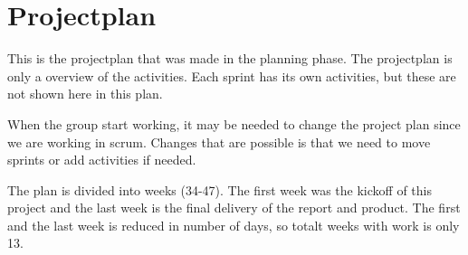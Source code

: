 \section{Projectplan}

	This is the projectplan that was made in the planning phase. The projectplan
	is only a overview of the activities. Each sprint has its own activities, but
	these are not shown here in this plan. 

	When the group start working, it may be needed to change the project plan since we
	are working in scrum. Changes that are possible is that we need to move sprints or
	add activities if needed. 

	The plan is divided into weeks (34-47). The first week was the kickoff of this project
	and the last week is the final delivery of the report and product.
	The first and the last week is reduced in number of days, so totalt weeks with work is
	only 13. \\

